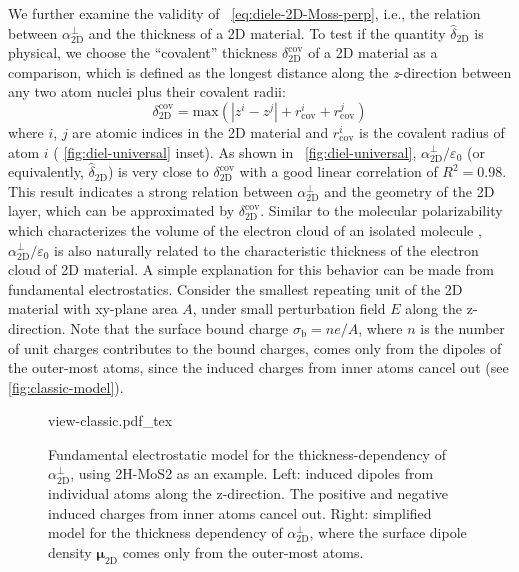 We further examine the validity of ~\autoref{eq:diele-2D-Moss-perp},
i.e., the relation between $\alpha_{\mathrm{2D}}^{\perp}$ and the
thickness of a 2D material. To test if the quantity
$\hat{\delta}_{\mathrm{2D}}$ is physical, we choose the ``covalent''
thickness $\delta_{\mathrm{2D}}^{\mathrm{cov}}$ of a 2D material as a
comparison, which is defined as the
longest distance along the \textit{z}-direction between any two atom
nuclei plus their covalent radii:
%
%
\begin{equation}
  \label{eq:diele-cov-thick}
  \delta_{\mathrm{2D}}^{\mathrm{cov}} = \mathrm{max}(|z^{i} - z^{j}|
  + r^{i}_{\mathrm{cov}} + r^{j}_{\mathrm{cov}})
\end{equation}
where $i$, $j$ are atomic indices in the 2D material and
$r_{\mathrm{cov}}^{i}$ is the covalent radius of atom $i$ (
\autoref{fig:diel-universal} inset). As shown in
~\autoref{fig:diel-universal},
$\alpha_{\mathrm{2D}}^{\perp}/\varepsilon_{0}$ (or equivalently,
$\hat{\delta}_{\mathrm{2D}}$) is very close to
$\delta_{\mathrm{2D}}^{\mathrm{cov}}$ with a good linear correlation
of $R^{2}=0.98$. This result indicates a strong relation between
$\alpha_{\mathrm{2D}}^{\perp}$ and the geometry of the 2D layer, which
can be approximated by $\delta_{\mathrm{2D}}^{\mathrm{cov}}$. Similar
to the molecular polarizability which characterizes the volume of the
electron cloud of an isolated molecule \cite{Israelachvili_2011_book},
$\alpha_{\mathrm{2D}}^{\perp}/\varepsilon_{0}$ is also naturally
related to the characteristic thickness of the electron cloud of 2D
material. A simple explanation for this behavior can be made from
fundamental electrostatics. Consider the smallest repeating unit of
the 2D material with xy-plane area $A$, under small perturbation field
$E$ along the z-direction.  Note that the surface bound charge
$\sigma_{\mathrm{b}}=n e /A$, where $n$ is the number of unit charges
contributes to the bound charges, comes only from the dipoles of the
outer-most atoms, since the induced charges from inner atoms cancel
out (see \autoref{fig:classic-model}).
\begin{figure}[htbp]
  \centering
  {view-classic.pdf_tex}
  \caption{Fundamental electrostatic model for the
    thickness-dependency of $\alpha_{\mathrm{2D}}^{\perp}$, using 2H-MoS2 as an
    example. Left: induced dipoles from individual atoms along the
    z-direction. The positive and negative induced charges from inner
    atoms cancel out. Right: simplified model for the thickness
    dependency of $\alpha_{\mathrm{2D}}^{\perp}$, where the surface dipole density $\symbf{\mu}_{\mathrm{2D}}$ comes only from the outer-most atoms.}
  \label{fig:classic-model}
\end{figure}
